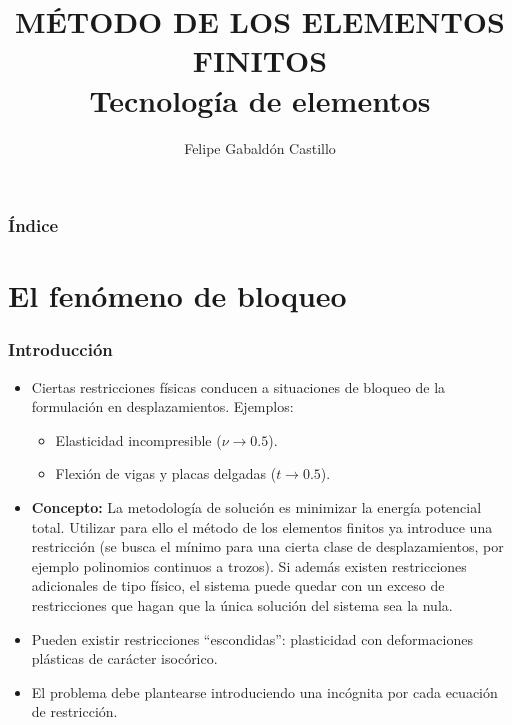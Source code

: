 \documentclass[handout]{beamer}
\title[Tecnología de elementos]{MÉTODO DE LOS ELEMENTOS FINITOS \\
Tecnología de elementos}
\author[F. Gabaldón]{Felipe Gabaldón Castillo}
\date{}
\begin{document}
\begin{frame}
\titlepage
\end{frame}
\begin{frame}
\frametitle{Índice}
\tableofcontents
\end{frame}
\section{El fenómeno de bloqueo}
\begin{frame}
\frametitle{Introducción}
\begin{itemize}
\item Ciertas restricciones físicas conducen a situaciones de bloqueo de
la formulación en desplazamientos. Ejemplos:
\begin{itemize}
\item Elasticidad incompresible ($\nu \rightarrow 0.5$).
\item Flexión de vigas y placas delgadas ($t \rightarrow 0.5$).
\end{itemize}
\item {\bf Concepto:} La
metodología de solución es minimizar la energía
potencial total. Utilizar para ello el método de los elementos finitos
ya introduce una restricción (se busca el mínimo para una cierta clase de
desplazamientos, por ejemplo polinomios continuos a trozos). Si además existen
restricciones adicionales de tipo físico, el sistema puede quedar con un
exceso de restricciones que hagan que la única solución del sistema sea
la nula.
\item Pueden existir restricciones ``escondidas'':
plasticidad con deformaciones plásticas de carácter isocórico.
\item El problema debe plantearse introduciendo una incógnita por cada ecuación
de restricción.
\end{itemize}
\end{frame}
\end{document}
